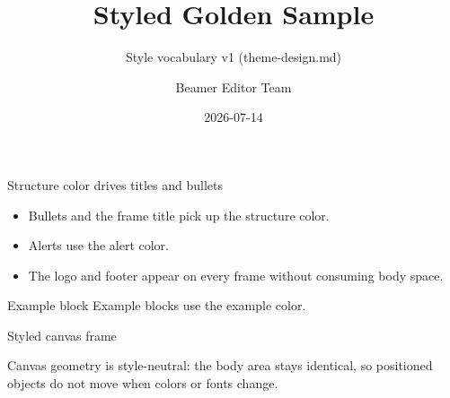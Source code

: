 \documentclass[aspectratio=169]{beamer}
\title{Styled Golden Sample}
\subtitle{Style vocabulary v1 (theme-design.md)}
\author{Beamer Editor Team}
\date{2026-07-14}
\begin{document}
\begin{frame}
  \titlepage
\end{frame}

\begin{frame}{Structure color drives titles and bullets}
  \begin{itemize}
    \item Bullets and the frame title pick up the structure color.
    \item \alert{Alerts} use the alert color.
    \item The logo and footer appear on every frame without consuming body space.
  \end{itemize}
  \begin{exampleblock}{Example block}
    Example blocks use the example color.
  \end{exampleblock}
\end{frame}

\begin{frame}[label=styled-canvas]{Styled canvas frame}
  \begin{deckcanvas}
    \begin{decktext}[x=0.050,y=0.150,w=0.500,size=normal]
      Canvas geometry is style-neutral: the body area stays identical, so
      positioned objects do not move when colors or fonts change.
    \end{decktext}
  \end{deckcanvas}
\end{frame}
\end{document}
